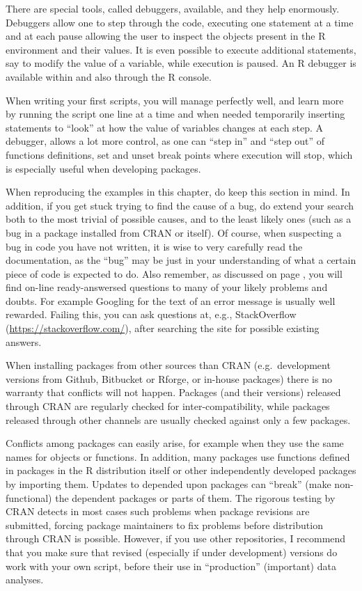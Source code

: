 \documentclass[krantz2]{krantz}\usepackage{knitr}%
\begin{document}
There are special tools, called debuggers, available, and they help enormously. Debuggers allow one to step through the code, executing one statement at a time and at each pause allowing the user to inspect the objects present in the R environment and their values. It is even possible to execute additional statements, say to modify the value of a variable, while execution is paused. An R debugger is available within \RStudio and also through the R console.

When writing your first scripts, you will manage perfectly well, and learn more by running the script one line at a time and when needed temporarily inserting  statements to ``look'' at how the value of variables changes at each step. A debugger, allows a lot more control, as one can ``step in'' and ``step out'' of functions definitions, set and unset break points where execution will stop, which is especially useful when developing \Rlang packages.

When reproducing the examples in this chapter, do keep this section in mind. In addition, if you get stuck trying to find the cause of a bug, do extend your search both to the most trivial of possible causes, and to the least likely ones (such as a bug in a package installed from CRAN or \Rlang itself). Of course, when suspecting a bug in code you have not written, it is wise to very carefully read the documentation, as the ``bug'' may be just in your understanding of what a certain piece of code is expected to do.  Also remember, as discussed on page \pageref{sec:getting:help}, you will find on-line ready-answersed questions to many of your likely problems and doubts. For example Googling for the text of an error message is usually well rewarded. Failing this, you can ask questions at, e.g., StackOverflow (\url{https://stackoverflow.com/}), after searching the site for possible existing answers.

\begin{warningbox}
When installing packages from other sources than CRAN (e.g.\ development versions from Github, Bitbucket or Rforge, or in-house packages) there is no warranty that conflicts will not happen. Packages (and their versions) released through CRAN are regularly checked for inter-compatibility, while packages released through other channels are usually checked against only a few packages.

Conflicts among packages can easily arise, for example when they use the same names for objects or functions. In addition, many packages use functions defined in packages in the R distribution itself or other independently developed packages by importing them. Updates to depended upon packages can ``break'' (make non-functional) the dependent packages or parts of them. The rigorous testing by CRAN detects in most cases such problems when package revisions are submitted, forcing package maintainers to fix problems before distribution through CRAN is possible. However, if you use other repositories, I recommend that you make sure that revised (especially if under development) versions do work with your own script, before their use in ``production'' (important) data analyses.
\end{warningbox}
\end{document}
